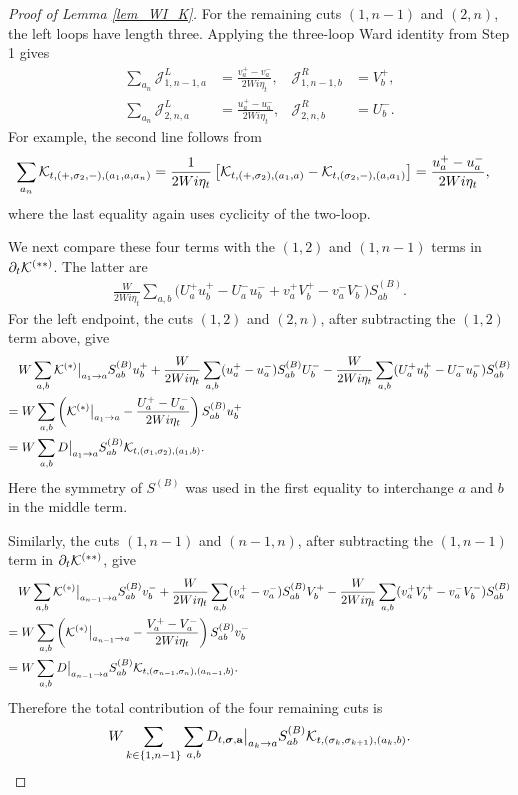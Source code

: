 \documentclass[10pt,reqno]{article}
\theoremstyle{plain} %
\theoremstyle{remark}
\numberwithin{equation}{section}
\begin{document}
\begin{proof}[Proof of Lemma \ref{lem_WI_K}]
For the remaining cuts $(1,n-1)$ and $(2,n)$, the left loops have length
three. Applying the three-loop Ward identity from Step 1 gives
\begin{equation}
\begin{aligned}
 \sum_{a_n}\mathcal J^L_{1,n-1,a}
 &=\frac{v_a^+-v_a^-}{2Wi\eta_t},
 &\mathcal J^R_{1,n-1,b}&=V_b^+,\\
 \sum_{a_n}\mathcal J^L_{2,n,a}
 &=\frac{u_a^+-u_a^-}{2Wi\eta_t},
 &\mathcal J^R_{2,n,b}&=U_b^-.
\end{aligned}
\end{equation}
For example, the second line follows from
\begin{align*}
 \sum_{a_n}
 {\cal K}_{t,(+,\sigma_2,-),(a_1,a,a_n)}
 &=\frac{1}{2Wi\eta_t}
 \left[
 {\cal K}_{t,(+,\sigma_2),(a_1,a)}
 -{\cal K}_{t,(\sigma_2,-),(a,a_1)}
 \right] =\frac{u_a^+-u_a^-}{2Wi\eta_t},
\end{align*}
where the last equality again uses cyclicity of the two-loop.

We next compare these four terms with the $(1,2)$ and $(1,n-1)$ terms
in $\partial_t{\cal K}^{(**)}$. The latter are
\begin{align*}
 \frac{W}{2Wi\eta_t}\sum_{a,b}
 \bigl(
 U_a^+u_b^+-U_a^-u_b^-
 +v_a^+V_b^+-v_a^-V_b^-
 \bigr)S^{(B)}_{ab}.
\end{align*}
For the left endpoint, the cuts $(1,2)$ and $(2,n)$, after subtracting
the $(1,2)$ term above, give
\begin{align*}
 &W\sum_{a,b}{\cal K}^{(*)}\big|_{a_1\to a}S^{(B)}_{ab}u_b^+
 +\frac{W}{2Wi\eta_t}\sum_{a,b}
 (u_a^+-u_a^-)S^{(B)}_{ab}U_b^- 
 -\frac{W}{2Wi\eta_t}\sum_{a,b}
 (U_a^+u_b^+-U_a^-u_b^-)S^{(B)}_{ab}\\
 =&\;W\sum_{a,b}
 \left({\cal K}^{(*)}\big|_{a_1\to a}
 -\frac{U_a^+-U_a^-}{2Wi\eta_t}\right)
 S^{(B)}_{ab}u_b^+\\
 =&\;W\sum_{a,b}D\big|_{a_1\to a}S^{(B)}_{ab}
 {\cal K}_{t,(\sigma_1,\sigma_2),(a_1,b)}.
\end{align*}
Here the symmetry of $S^{(B)}$ was used in the first equality to interchange
$a$ and $b$ in the middle term.

Similarly, the cuts $(1,n-1)$ and $(n-1,n)$, after subtracting the
$(1,n-1)$ term in $\partial_t{\cal K}^{(**)}$, give
\begin{align*}
 &W\sum_{a,b}{\cal K}^{(*)}\big|_{a_{n-1}\to a}S^{(B)}_{ab}v_b^-
 +\frac{W}{2Wi\eta_t}\sum_{a,b}
 (v_a^+-v_a^-)S^{(B)}_{ab}V_b^+ 
 -\frac{W}{2Wi\eta_t}\sum_{a,b}
 (v_a^+V_b^+-v_a^-V_b^-)S^{(B)}_{ab}\\
=&\;W\sum_{a,b}
 \left({\cal K}^{(*)}\big|_{a_{n-1}\to a}
 -\frac{V_a^+-V_a^-}{2Wi\eta_t}\right)
 S^{(B)}_{ab}v_b^-\\
=&\;W\sum_{a,b}D\big|_{a_{n-1}\to a}S^{(B)}_{ab}
 {\cal K}_{t,(\sigma_{n-1},\sigma_n),(a_{n-1},b)}.
\end{align*}
Therefore the total contribution of the four remaining cuts is
\begin{equation}\label{uisiip222}
 W\sum_{k\in\{1,n-1\}}\sum_{a,b}
 D_{t,\boldsymbol{\sigma},\textbf{a}}\big|_{a_k\to a}
 S^{(B)}_{ab}{\cal K}_{t,(\sigma_k,\sigma_{k+1}),(a_k,b)}.
\end{equation}


\end{proof}
\end{document}

